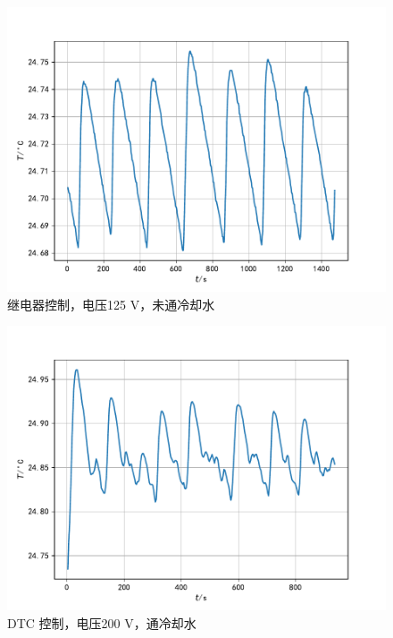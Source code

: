 \documentclass[12pt]{ctexart}
\numberwithin{equation}{section}
\begin{document}
\begin{figure}[!h]
    \centering
    \includegraphics[scale=0.68]{Figure_4.pdf}
    \caption{继电器控制，电压125 V，未通冷却水}
\end{figure}

\begin{figure}[!h]
    \centering
    \includegraphics[scale=0.68]{Figure_5.pdf}
    \caption{DTC 控制，电压200 V，通冷却水}
\end{figure}
\end{document}
